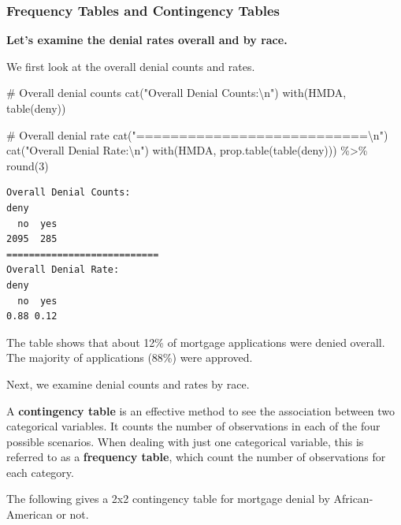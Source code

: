 \documentclass[
  12pt,
  letterpaper,
]{scrbook}
\newenvironment{Shaded}{\begin{snugshade}}{\end{snugshade}}
\newcommand{\CommentTok}[1]{\textcolor[rgb]{0.37,0.37,0.37}{#1}}
\newcommand{\DecValTok}[1]{\textcolor[rgb]{0.68,0.00,0.00}{#1}}
\newcommand{\FunctionTok}[1]{\textcolor[rgb]{0.28,0.35,0.67}{#1}}
\newcommand{\NormalTok}[1]{\textcolor[rgb]{0.00,0.23,0.31}{#1}}
\newcommand{\SpecialCharTok}[1]{\textcolor[rgb]{0.37,0.37,0.37}{#1}}
\newcommand{\StringTok}[1]{\textcolor[rgb]{0.13,0.47,0.30}{#1}}
\theoremstyle{plain}
\theoremstyle{definition}
\theoremstyle{remark}
\begin{document}
\subsubsection{Frequency Tables and Contingency
Tables}\label{frequency-tables-and-contingency-tables}

\textbf{Let's examine the denial rates overall and by race.}

We first look at the overall denial counts and rates.

\begin{Shaded}
\begin{Highlighting}[]
\CommentTok{\# Overall denial counts}
\FunctionTok{cat}\NormalTok{(}\StringTok{"Overall Denial Counts:}\SpecialCharTok{\textbackslash{}n}\StringTok{"}\NormalTok{)}
\FunctionTok{with}\NormalTok{(HMDA, }\FunctionTok{table}\NormalTok{(deny))}

\CommentTok{\# Overall denial rate}
\FunctionTok{cat}\NormalTok{(}\StringTok{"===========================}\SpecialCharTok{\textbackslash{}n}\StringTok{"}\NormalTok{)}
\FunctionTok{cat}\NormalTok{(}\StringTok{"Overall Denial Rate:}\SpecialCharTok{\textbackslash{}n}\StringTok{"}\NormalTok{)}
\FunctionTok{with}\NormalTok{(HMDA, }\FunctionTok{prop.table}\NormalTok{(}\FunctionTok{table}\NormalTok{(deny))) }\SpecialCharTok{\%\textgreater{}\%} \FunctionTok{round}\NormalTok{(}\DecValTok{3}\NormalTok{)}
\end{Highlighting}
\end{Shaded}

\begin{verbatim}
Overall Denial Counts:
deny
  no  yes 
2095  285 
===========================
Overall Denial Rate:
deny
  no  yes 
0.88 0.12 
\end{verbatim}

The table shows that about 12\% of mortgage applications were denied
overall. The majority of applications (88\%) were approved.

Next, we examine denial counts and rates by race.

A {\textbf{contingency table}} is an effective method to see the
association between two categorical variables. It counts the number of
observations in each of the four possible scenarios. When dealing with
just one categorical variable, this is referred to as a
\textbf{frequency table}, which count the number of observations for
each category.

The following gives a 2x2 contingency table for mortgage denial by
African-American or not.
\end{document}
